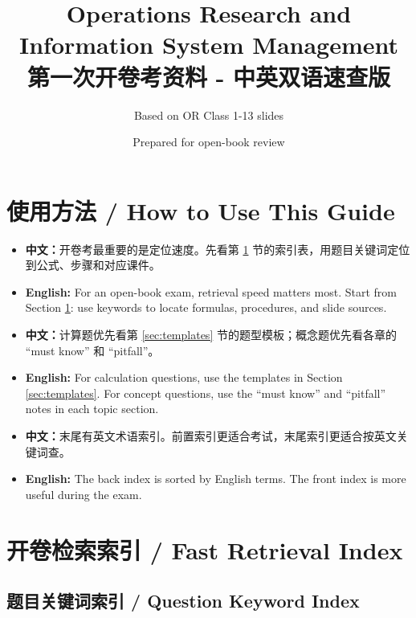 \documentclass[10pt,a4paper]{ctexart}
\title{\textbf{Operations Research and Information System Management}\\
\large 第一次开卷考资料 - 中英双语速查版}
\author{Based on OR Class 1-13 slides}
\date{Prepared for open-book review}
\newcommand{\cn}[1]{\textbf{中文：}#1}
\newcommand{\en}[1]{\textbf{English:} #1}
\begin{document}
\maketitle
\tableofcontents
\newpage

\section*{使用方法 / How to Use This Guide}

\begin{itemize}
  \item \cn{开卷考最重要的是定位速度。先看第 \ref{sec:fast-index} 节的索引表，用题目关键词定位到公式、步骤和对应课件。}
  \item \en{For an open-book exam, retrieval speed matters most. Start from Section \ref{sec:fast-index}: use keywords to locate formulas, procedures, and slide sources.}
  \item \cn{计算题优先看第 \ref{sec:templates} 节的题型模板；概念题优先看各章的 ``must know'' 和 ``pitfall''。}
  \item \en{For calculation questions, use the templates in Section \ref{sec:templates}. For concept questions, use the ``must know'' and ``pitfall'' notes in each topic section.}
  \item \cn{末尾有英文术语索引。前置索引更适合考试，末尾索引更适合按英文关键词查。}
  \item \en{The back index is sorted by English terms. The front index is more useful during the exam.}
\end{itemize}

\section{开卷检索索引 / Fast Retrieval Index}
\label{sec:fast-index}

\subsection{题目关键词索引 / Question Keyword Index}
\end{document}
